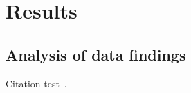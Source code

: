 
\chapter{Results}\label{chapter:results}

\section{Analysis of data findings}
Citation test~\parencite{latex}.




